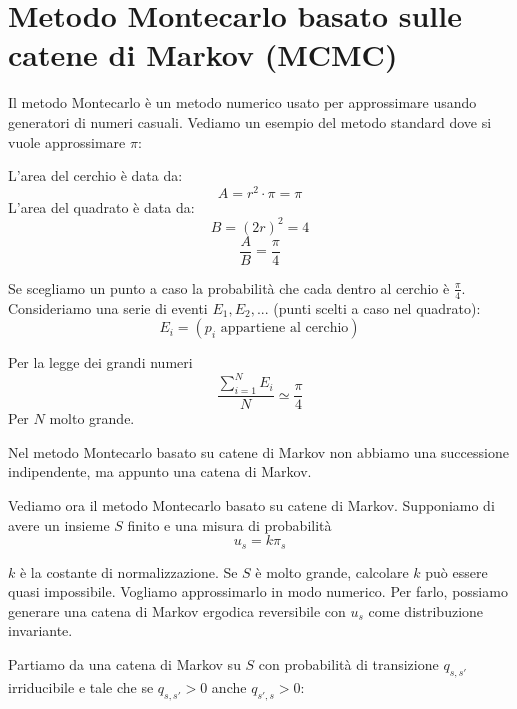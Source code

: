 \documentclass[a4paper,12pt]{book}
\newcommand\ddfrac[2]{\frac{\displaystyle #1}{\displaystyle #2}}
\begin{document}
\section{Metodo Montecarlo basato sulle catene di Markov (MCMC)}
Il metodo Montecarlo è un metodo numerico usato per approssimare usando generatori di numeri casuali. Vediamo un esempio del metodo standard dove si vuole approssimare $\pi$:
\begin{multicols}{2}
	
	L'area del cerchio è data da:
	$$ A = r^2\cdot \pi = \pi $$
	L'area del quadrato è data da:
	$$ B = (2r)^2 = 4 $$
	$$ \ddfrac{A}{B} = \frac{\pi}{4}$$
	
\end{multicols}

Se scegliamo un punto a caso la probabilità che cada dentro al cerchio è $\frac{\pi}{4}$. Consideriamo una serie di eventi $ E_1, E_2, ... $ (punti scelti a caso nel quadrato):
$$ E_i = (p_i \text{ appartiene al cerchio})$$

Per la legge dei grandi numeri
$$ \ddfrac{\sum_{i=1}^{N} E_i}{N} \simeq \ddfrac{\pi}{4} $$
Per $ N $ molto grande. 

Nel metodo Montecarlo basato su catene di Markov non abbiamo una successione indipendente, ma appunto una catena di Markov. 

Vediamo ora il metodo Montecarlo basato su catene di Markov. Supponiamo di avere un insieme $ S $ finito e una misura di probabilità 
$$ u_s = k\pi_s $$

$ k $ è la costante di normalizzazione. Se $ S $ è molto grande, calcolare $ k $ può essere quasi impossibile. Vogliamo approssimarlo in modo numerico. Per farlo, possiamo generare una catena di Markov ergodica reversibile con $ u_s $ come distribuzione invariante. 

Partiamo da una catena di Markov su $ S $ con probabilità di transizione $ q_{s,s'} $ irriducibile e tale che se $ q_{s,s'} > 0 $ anche $ q_{s',s} > 0 $:
\end{document}
